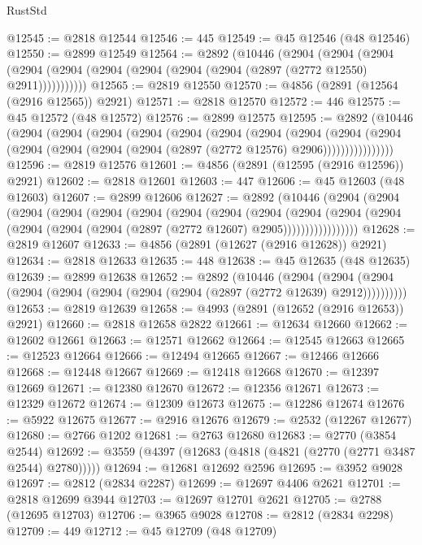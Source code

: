 \begin{lexlean}{RustStd}
\begin{coremodule}
@12545 := @2818 @12544
@12546 := 445
@12549 := @45 @12546 (@48 @12546)
@12550 := @2899 @12549
@12564 := @2892
    (@10446
      (@2904
        (@2904
          (@2904 (@2904 (@2904 (@2904 (@2904 (@2904 (@2904 (@2897 (@2772 @12550) @2911)))))))))))
@12565 := @2819 @12550
@12570 := @4856 (@2891 (@12564 (@2916 @12565)) @2921)
@12571 := @2818 @12570
@12572 := 446
@12575 := @45 @12572 (@48 @12572)
@12576 := @2899 @12575
@12595 := @2892
    (@10446
      (@2904
        (@2904
          (@2904
            (@2904
              (@2904
                (@2904
                  (@2904
                    (@2904
                      (@2904
                        (@2904
                          (@2904 (@2904 (@2904 (@2904 (@2897 (@2772 @12576) @2906))))))))))))))))
@12596 := @2819 @12576
@12601 := @4856 (@2891 (@12595 (@2916 @12596)) @2921)
@12602 := @2818 @12601
@12603 := 447
@12606 := @45 @12603 (@48 @12603)
@12607 := @2899 @12606
@12627 := @2892
    (@10446
      (@2904
        (@2904
          (@2904
            (@2904
              (@2904
                (@2904
                  (@2904
                    (@2904
                      (@2904
                        (@2904
                          (@2904
                            (@2904 (@2904 (@2904 (@2904 (@2897 (@2772 @12607) @2905)))))))))))))))))
@12628 := @2819 @12607
@12633 := @4856 (@2891 (@12627 (@2916 @12628)) @2921)
@12634 := @2818 @12633
@12635 := 448
@12638 := @45 @12635 (@48 @12635)
@12639 := @2899 @12638
@12652 := @2892
    (@10446
      (@2904 (@2904 (@2904 (@2904 (@2904 (@2904 (@2904 (@2904 (@2897 (@2772 @12639) @2912))))))))))
@12653 := @2819 @12639
@12658 := @4993 (@2891 (@12652 (@2916 @12653)) @2921)
@12660 := @2818 @12658 @2822
@12661 := @12634 @12660
@12662 := @12602 @12661
@12663 := @12571 @12662
@12664 := @12545 @12663
@12665 := @12523 @12664
@12666 := @12494 @12665
@12667 := @12466 @12666
@12668 := @12448 @12667
@12669 := @12418 @12668
@12670 := @12397 @12669
@12671 := @12380 @12670
@12672 := @12356 @12671
@12673 := @12329 @12672
@12674 := @12309 @12673
@12675 := @12286 @12674
@12676 := @5922 @12675
@12677 := @2916 @12676
@12679 := @2532 (@12267 @12677)
@12680 := @2766 @1202
@12681 := @2763 @12680
@12683 := @2770 (@3854 @2544)
@12692 := @3559 (@4397 (@12683 (@4818 (@4821 (@2770 (@2771 @3487 @2544) @2780)))))
@12694 := @12681 @12692 @2596
@12695 := @3952 @9028
@12697 := @2812 (@2834 @2287)
@12699 := @12697 @4406 @2621
@12701 := @2818 @12699 @3944
@12703 := @12697 @12701 @2621
@12705 := @2788 (@12695 @12703)
@12706 := @3965 @9028
@12708 := @2812 (@2834 @2298)
@12709 := 449
@12712 := @45 @12709 (@48 @12709)

\end{coremodule}
\end{lexlean}
